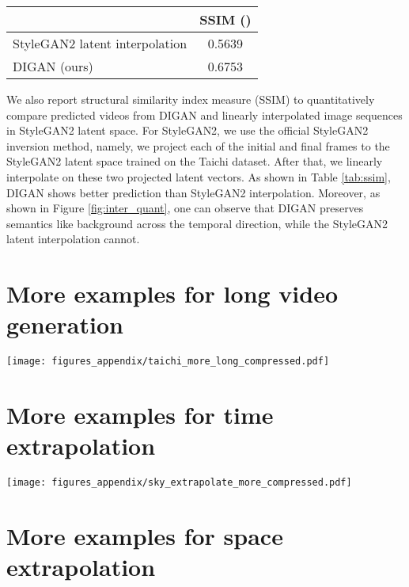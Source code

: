 \documentclass{article} \usepackage{iclr2022_conference,times}
\begin{document}
\begin{table*}[h]
\centering
\caption{
SSIM of intermediate scenes predicted by StyleGAN2 and our method, \sname.
}
\vspace{-0.1in}
\begin{tabular}{lc}
\toprule
& SSIM () \\
\midrule
StyleGAN2 latent interpolation & 0.5639 \\
DIGAN (ours)                   & 0.6753 \\
\bottomrule
\end{tabular}
\label{tab:ssim}
\end{table*}

We also report structural similarity index measure (SSIM) to quantitatively compare predicted videos from DIGAN and linearly interpolated image sequences in StyleGAN2 latent space. For StyleGAN2, we use the official StyleGAN2 inversion method, namely, we project each of the initial and final frames to the StyleGAN2 latent space trained on the Taichi dataset. After that, we linearly interpolate on these two projected latent vectors. As shown in Table \ref{tab:ssim}, DIGAN shows better prediction than StyleGAN2 interpolation. Moreover, as shown in Figure \ref{fig:inter_quant}, one can observe that DIGAN preserves semantics like background across the temporal direction, while the StyleGAN2 latent interpolation cannot.
 
\clearpage
\section{More examples for long video generation}
\label{appen:more_long}

\begin{figure*}[h]
\centering
\texttt{[image: figures\_appendix/taichi\_more\_long\_compressed.pdf]}
\caption{
Additional 128 frame videos of 128×128 resolution by \sname, on the TaiChi dataset.
}\label{fig:more_long}
\end{figure*}
 
\clearpage
\section{More examples for time extrapolation}
\label{appen:more_time}

\begin{figure*}[h]
\centering
\texttt{[image: figures\_appendix/sky\_extrapolate\_more\_compressed.pdf]}
\caption{
Additional time extrapolation videos of MoCoGAN-HD and \sname, trained on 16 frame videos of 128128 resolution on the Sky dataset. Yellow box indicates the extrapolated frames.
}\label{fig:more_time_extra}
\end{figure*} \section{More examples for space extrapolation}
\label{appen:more_space}
\end{document}
